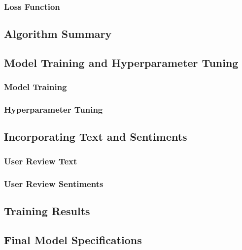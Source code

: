 \subsubsection{Loss Function}
\label{subsubsec:Loss Function}

\subsection{Algorithm Summary}
\label{subsec:Algorithm Summary}

\subsection{Model Training and Hyperparameter Tuning}
\label{subsec:Model Training and Hyperparameter Tuning}

\subsubsection{Model Training}
\label{subsubsec:Model Training}

\subsubsection{Hyperparameter Tuning}
\label{subsubsec:Hyperparameter Tuning}

\subsection{Incorporating Text and Sentiments}
\label{subsec:Incorporating Text and Sentiments}

\subsubsection{User Review Text}
\label{subsubsec:User Review Text}

\subsubsection{User Review Sentiments}
\label{subsubsec:User Review Sentiments}

\subsection{Training Results}
\label{subsec:Training Results}

\subsection{Final Model Specifications}
\label{subsec:Final Model Specifications}

